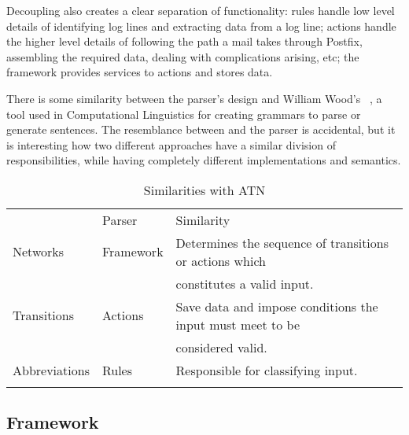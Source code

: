 \documentclass[]{svmult}
\begin{document}
Decoupling also creates a clear separation of functionality: rules handle low
level details of identifying log lines and extracting data from a log line;
actions handle the higher level details of following the path a mail takes
through Postfix, assembling the required data, dealing with complications
arising, etc; the framework provides services to actions and stores data.  

There is some similarity between the parser's design and William Wood's
\ATN{}~\cite{atns, nlpip}, a tool used in Computational Linguistics for
creating grammars to parse or generate sentences.  The resemblance between
\ATN{} and the parser is accidental, but it is interesting how two
different approaches have a similar division of responsibilities, while
having completely different implementations and semantics.


\begin{table}[ht]
    \caption{Similarities with ATN}\label{Similarities with ATN}
    \begin{tabular}[]{lll}
        \hline
        \noalign{\smallskip}
        \ATN{}        & Parser    & Similarity                          \\
        \noalign{\smallskip}
        \hline
        \noalign{\smallskip}
        Networks      & Framework & Determines the sequence of
                                    transitions or actions which        \\
                      &           & constitutes a valid input.          \\
        Transitions   & Actions   & Save data and impose conditions the
                                    input must meet to be               \\
                      &           & considered valid.                   \\
        Abbreviations & Rules     & Responsible for classifying input.  \\
        \noalign{\smallskip}
        \hline
        \noalign{\smallskip}
    \end{tabular}
\end{table}

\subsection{Framework}

\label{Framework}
\end{document}

